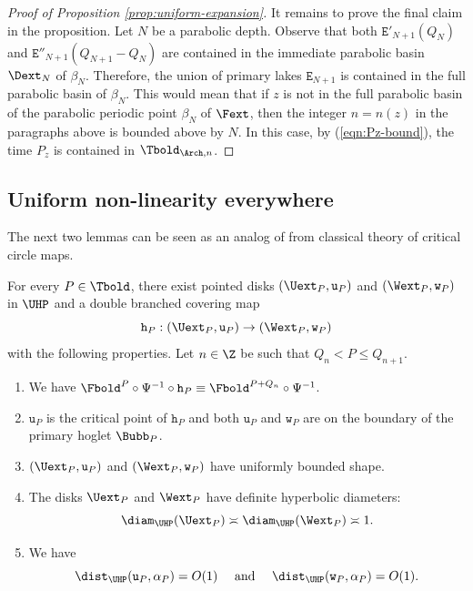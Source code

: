 \documentclass{amsart}
\begin{document}
\begin{proof}[Proof of Proposition \ref{prop:uniform-expansion}]
    It remains to prove the final claim in the proposition.
    Let $N$ be a parabolic depth.
    Observe that both $\mathtt{E}'_{N+1}(Q_N)$ and $\mathtt{E}''_{N+1}(Q_{N+1}-Q_N)$ are contained in the immediate parabolic basin $\Dext_{N}$ of $\beta_N$.
    Therefore, the union of primary lakes $\mathtt{E}_{N+1}$ is contained in the full parabolic basin of $\beta_N$.
    This would mean that if $z$ is not in the full parabolic basin of the parabolic periodic point $\beta_N$ of $\Fext$, then the integer $n=n(z)$ in the paragraphs above is bounded above by $N$.
    In this case, by (\ref{eqn:Pz-bound}), the time $P_z$ is contained in $\Tbold_{\Arch,n}$.
\end{proof}

\subsection{Uniform non-linearity everywhere}
The next two lemmas can be seen as an analog of \cite[Section 6]{dFdM00} from classical theory of critical circle maps.

\begin{lemma}
\label{lem:non-linearity-1}
    For every $P \in \Tbold$, there exist pointed disks $(\Uext_P, \mathtt{u}_P)$ and $(\Wext_P, \mathtt{w}_P)$ in $\UHP$ and a double branched covering map
    \[
        \mathtt{h}_P : ( \Uext_P, \mathtt{u}_P) \to (\Wext_P, \mathtt{w}_P)
    \]
    with the following properties. 
    Let $n \in \Z$ be such that $Q_n < P \leq Q_{n+1}$.
    \begin{enumerate}
        \item We have $\Fbold^{P} \circ \Psi^{-1} \circ \mathtt{h}_P \equiv \Fbold^{P+Q_n} \circ  \Psi^{-1}$.
        \item $\mathtt{u}_P$ is the critical point of $\mathtt{h}_P$ and both $\mathtt{u}_P$ and $\mathtt{w}_P$ are on the boundary of the primary hoglet $\Bubb_P$.
        \item $(\Uext_P, \mathtt{u}_P)$ and $(\Wext_P, \mathtt{w}_P)$ have uniformly bounded shape.
        \item The disks $\Uext_P$ and $\Wext_P$ have definite hyperbolic diameters:
        \[
        \diam_{\UHP}(\Uext_P) \asymp \diam_{\UHP}(\Wext_P) \asymp 1.
        \]
        \item We have
        \[
            \dist_{\UHP}(\mathtt{u}_P, \alpha_P) = O(1) 
            \quad \text{ and } \quad
            \dist_{\UHP}(\mathtt{w}_P, \alpha_P) = O(1).
        \]
    \end{enumerate}
\end{lemma}
\end{document}
